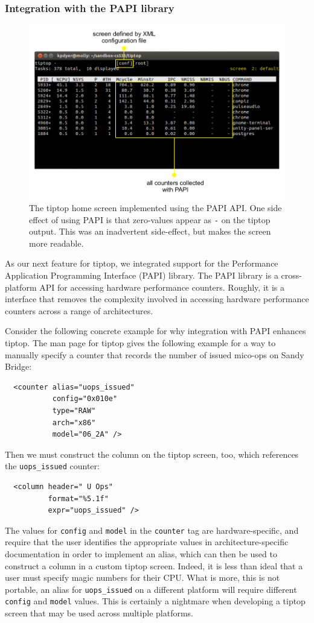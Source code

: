 \subsubsection{Integration with the PAPI library}
\begin{figure}[t]
\footnotesize
\centering
\includegraphics[width=.7\textwidth]{tiptop-papi}
\caption{\footnotesize The tiptop home screen implemented using the PAPI API. One side effect of using PAPI is that zero-values appear as \texttt{-} on the tiptop output. This was an inadvertent side-effect, but makes the screen more readable.}
\label{fig:tiptop-papi}
\end{figure}

As our next feature for tiptop, we integrated support for the Performance Application Programming Interface (PAPI) library.
The PAPI library is a cross-platform API for accessing hardware performance counters.
Roughly, it is a interface that removes the complexity involved in accessing hardware performance counters across a range of architectures.

Consider the following concrete example for why integration with PAPI enhances tiptop.
The man page for tiptop gives the following example for a way to manually specify a counter that records the number of issued mico-ops on Sandy Bridge:
\begin{verbatim}
  <counter alias="uops_issued"
           config="0x010e"
           type="RAW"
           arch="x86"
           model="06_2A" />
\end{verbatim}
Then we must construct the column on the tiptop screen, too, which references the \texttt{uops\_issued} counter:
\begin{verbatim}
  <column header=" U Ops"
          format="%5.1f"
          expr="uops_issued" />
\end{verbatim}
The values for \texttt{config} and \texttt{model} in the \texttt{counter} tag are hardware-specific, and require that the user identifies the appropriate values in architecture-specific documentation in order to implement an alias, which can then be used to construct a column in a custom tiptop screen.
Indeed, it is less than ideal that a user must specify magic numbers for their CPU.
What is more, this is not portable, an alias for \texttt{uops\_issued} on a different platform will require different \texttt{config} and \texttt{model} values.
This is certainly a nightmare when developing a tiptop screen that may be used across multiple platforms.

